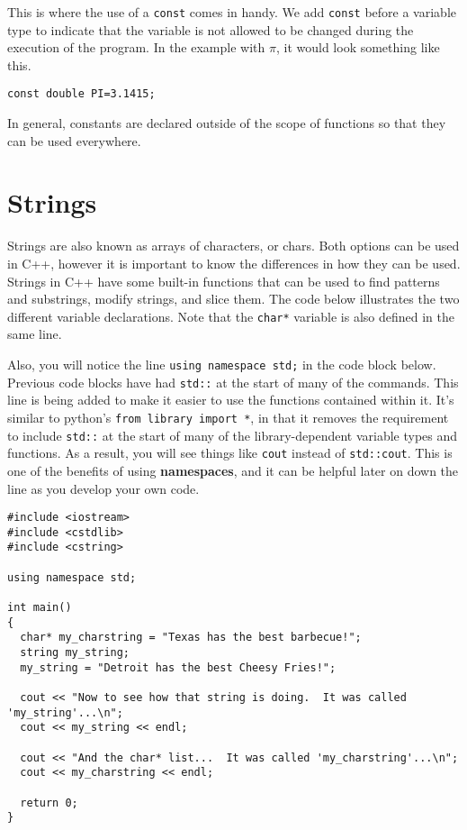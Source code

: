 This is where the use of a \texttt{const} comes in handy.  We add \texttt{const} before a variable type to indicate that the variable is not allowed to be changed during the execution of the program.  In the example with $\pi$, it would look something like this.

\begin{verbatim}
const double PI=3.1415;
\end{verbatim}

In general, constants are declared outside of the scope of functions so that they can be used everywhere.

\section{Strings}
Strings are also known as arrays of characters, or chars.  Both options can be used in C++, however it is important to know the differences in how they can be used.
Strings in C++ have some built-in functions that can be used to find patterns and substrings, modify strings, and slice them.  The code below illustrates the two different variable declarations.  Note that the \texttt{char*} variable is also defined in the same line.

Also, you will notice the line \texttt{using namespace std;} in the code block below.  Previous code blocks have had \texttt{std::} at the start of many of the commands. This line is being added to make it easier to use the functions contained within it. It's similar to python's \texttt{from library import *}, in that it removes the requirement to include \texttt{std::} at the start of many of the library-dependent variable types and functions.  As a result, you will see things like \texttt{cout} instead of \texttt{std::cout}.  This is one of the benefits of using \textbf{namespaces}, and it can be helpful later on down the line as you develop your own code.

\begin{verbatim}
#include <iostream>
#include <cstdlib>
#include <cstring>

using namespace std;

int main()
{
  char* my_charstring = "Texas has the best barbecue!";
  string my_string;
  my_string = "Detroit has the best Cheesy Fries!";

  cout << "Now to see how that string is doing.  It was called 'my_string'...\n";
  cout << my_string << endl;

  cout << "And the char* list...  It was called 'my_charstring'...\n";
  cout << my_charstring << endl;

  return 0;
}
\end{verbatim}

